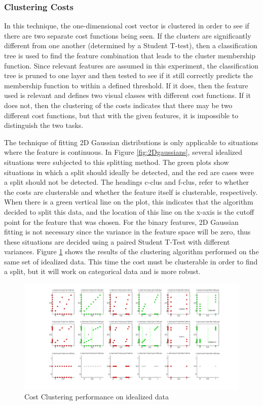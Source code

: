 \documentclass[12pt]{article}
\begin{document}
\subsubsection{Clustering Costs}

In this technique, the one-dimensional cost vector is clustered in order to see if there are two separate cost functions being seen. If the clusters are significantly different from one another (determined by a Student T-test), then a classification tree is used to find the feature combination that leads to the cluster membership function. Since relevant features are assumed in this experiment, the classification tree is pruned to one layer and then tested to see if it still correctly predicts the membership function to within a defined threshold. If it does, then the feature used is relevant and defines two visual classes with different cost functions. If it does not, then the clustering of the costs indicates that there may be two different cost functions, but that with the given features, it is impossible to distinguish the two tasks. 

The technique of fitting 2D Gaussian distributions is only applicable to situations where the feature is continuous. In Figure \ref{fig:2Dgaussians}, several idealized situations were subjected to this splitting method. The green plots show situations in which a split should ideally be detected, and the red are cases were a split should not be detected. The headings c-clus and f-clus, refer to whether the costs are clusterable and whether the feature itself is clusterable, respectively. When there is a green vertical line on the plot, this indicates that the algorithm decided to split this data, and the location of this line on the x-axis is the cutoff point for the feature that was chosen. For the binary features, 2D Gaussian fitting is not necessary since the variance in the feature space will be zero, thus these situations are decided using a paired Student T-Test with different variances. Figure \ref{fig:clustercosts} shows the results of the clustering algorithm performed on the same set of idealized data. This time the cost must be clusterable in order to find a split, but it will work on categorical data and is more robust. 


\begin{figure}[ht]
  \centerline{
  \includegraphics[width=1.5\columnwidth]{cluster_costs.png}}
  \caption{\label{fig_cluster_costs} Cost Clustering performance on idealized data}
  \label{fig:clustercosts}
\end{figure}
\end{document}
